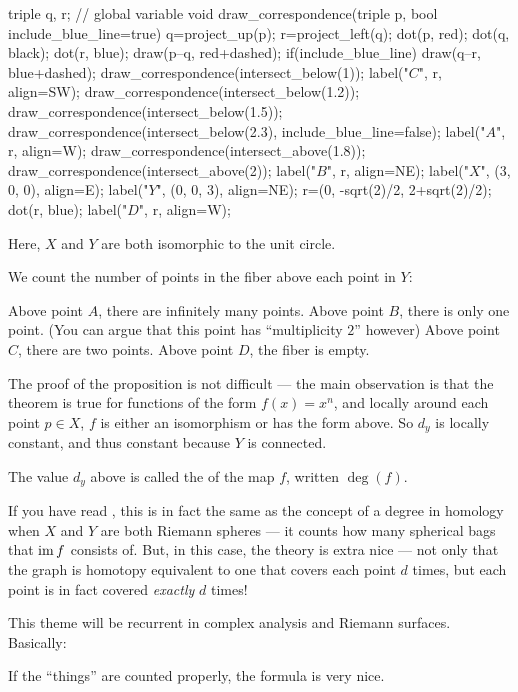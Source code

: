 \begin{example}
\begin{center}
\begin{asy}
		triple q, r; // global variable
		void draw_correspondence(triple p, bool include_blue_line=true){
			q=project_up(p);
			r=project_left(q);
			dot(p, red);
			dot(q, black);
			dot(r, blue);
			draw(p--q, red+dashed);
			if(include_blue_line) draw(q--r, blue+dashed);
		}
		draw_correspondence(intersect_below(1));
		label("$C$", r, align=SW);
		draw_correspondence(intersect_below(1.2));
		draw_correspondence(intersect_below(1.5));
		draw_correspondence(intersect_below(2.3), include_blue_line=false);
		label("$A$", r, align=W);
		draw_correspondence(intersect_above(1.8));
		draw_correspondence(intersect_above(2));
		label("$B$", r, align=NE);
		label("$X$", (3, 0, 0), align=E);
		label("$Y$", (0, 0, 3), align=NE);
		r=(0, -sqrt(2)/2, 2+sqrt(2)/2);
		dot(r, blue);
		label("$D$", r, align=W);
	\end{asy}
	\end{center}

	Here, $X$ and $Y$ are both isomorphic to the unit circle.

	We count the number of points in the fiber above each point in $Y$:
	\begin{itemize}
		\ii Above point $A$, there are infinitely many points.
		\ii Above point $B$, there is only one point. (You can argue that this point has
		``multiplicity $2$'' however)
		\ii Above point $C$, there are two points.
		\ii Above point $D$, the fiber is empty.
	\end{itemize}
\end{example}

The proof of the proposition is not difficult --- the main observation is that the theorem is true
for functions of the form $f(x) = x^n$, and locally around each point $p \in X$, $f$ is either an
isomorphism or has the form above.
So $d_y$ is locally constant, and thus constant because $Y$ is connected.

\begin{definition}
	The value $d_y$ above is called the  of the map $f$, written $\deg(f)$.
\end{definition}
If you have read ,
this is in fact the same as the concept of a degree in homology when $X$ and $Y$ are both Riemann
spheres --- it counts how many spherical bags that $\operatorname{im} f$ consists of.
But, in this case, the theory is extra nice --- not only that the graph is homotopy equivalent to
one that covers each point $d$ times, but each point is in fact covered \emph{exactly} $d$ times!


This theme will be recurrent in complex analysis and Riemann surfaces. Basically:
\begin{moral}
	If the ``things'' are counted properly, the formula is very nice.
\end{moral}

